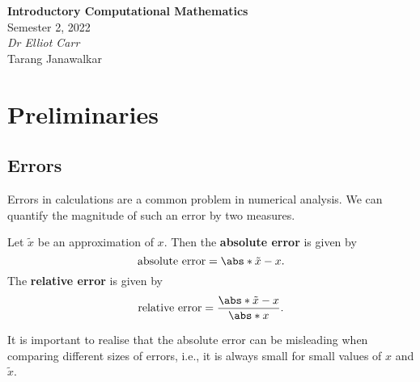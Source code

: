 \documentclass{article}
\date{}
\newcommand{\unitName}{Introductory Computational Mathematics}
\newcommand{\unitTime}{Semester 2, 2022}
\newcommand{\unitCoordinator}{Dr Elliot Carr}
\newcommand{\documentAuthors}{Tarang Janawalkar}
\begin{document}
%
\begin{titlepage}
    \vspace*{\fill}
    \begin{center}
        \LARGE{\textbf{\unitName}} \\[0.1in]
        \normalsize{\unitTime} \\[0.2in]
        \normalsize\textit{\unitCoordinator} \\[0.2in]
        \documentAuthors
    \end{center}
    \vspace*{\fill}
    \doclicenseThis
    \thispagestyle{empty}
\end{titlepage}
\newpage
%
\tableofcontents
\newpage
%
\section{Preliminaries}
\subsection{Errors}
Errors in calculations are a common problem in numerical analysis. We
can quantify the magnitude of such an error by two measures.
\begin{definition}
    Let \(\tilde{x}\) be an approximation of \(x\). Then the \textbf{absolute
        error} is given by
    \begin{equation*}
        \text{absolute error} = \abs*{\tilde{x}-x}.
    \end{equation*}
    The \textbf{relative error} is given by
    \begin{equation*}
        \text{relative error} = \frac{\abs*{\tilde{x}-x}}{\abs*{x}}.
    \end{equation*}
\end{definition}
It is important to realise that the absolute error can be
misleading when comparing different sizes of errors,
i.e., it is always small for small values of \(x\) and \(\tilde{x}\).
\end{document}
